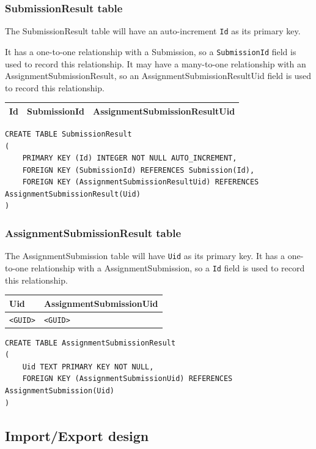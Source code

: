\documentclass[a4paper]{report}
\begin{document}
\subsubsection{SubmissionResult table}

The SubmissionResult table will have an auto-increment \verb|Id| as its primary key.

It has a one-to-one relationship with a Submission, so a \verb|SubmissionId| field is used to record this relationship. It may have a many-to-one relationship with an AssignmentSubmissionResult, so an AssignmentSubmissionResultUid field is used to record this relationship. 

\begin{tabulary}{\textwidth}{|L|L|L|}
    \hline
    Id & SubmissionId & AssignmentSubmissionResultUid \\
    \hline
\end{tabulary}

\begin{verbatim}
CREATE TABLE SubmissionResult
(
    PRIMARY KEY (Id) INTEGER NOT NULL AUTO_INCREMENT,
    FOREIGN KEY (SubmissionId) REFERENCES Submission(Id),
    FOREIGN KEY (AssignmentSubmissionResultUid) REFERENCES AssignmentSubmissionResult(Uid)
)
\end{verbatim}

\subsubsection{AssignmentSubmissionResult table}

The AssignmentSubmission table will have \verb|Uid| as its primary key. It has a one-to-one relationship with a AssignmentSubmission, so a \verb|Id| field is used to record this relationship.

\begin{tabulary}{\textwidth}{|L|L|}
    \hline
    Uid & AssignmentSubmissionUid \\
    \hline
    \verb|<GUID>| & \verb|<GUID>| \\
    \hline
\end{tabulary}

\begin{verbatim}
CREATE TABLE AssignmentSubmissionResult
(
    Uid TEXT PRIMARY KEY NOT NULL,
    FOREIGN KEY (AssignmentSubmissionUid) REFERENCES AssignmentSubmission(Uid)
)
\end{verbatim}

\subsection{Import/Export design}
\end{document}
